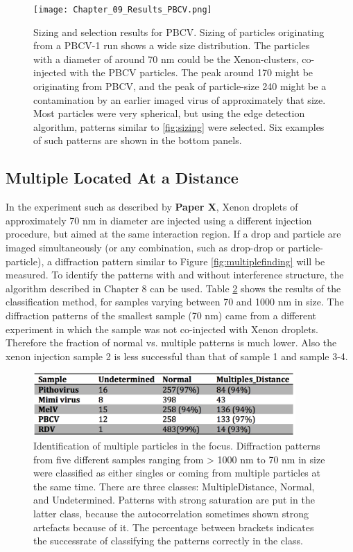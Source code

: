\begin{figure}[!ht]
\centering
\texttt{[image: Chapter\_09\_Results\_PBCV.png]}
\caption{Sizing and selection results for PBCV. Sizing of particles originating from a PBCV-1 run shows a wide size distribution. The particles with a diameter of around 70 nm could be the Xenon-clusters, co-injected with the PBCV particles. The peak around 170 might be originating from PBCV, and the peak of particle-size 240 might be a contamination by an earlier imaged virus of approximately that size. Most particles were very spherical, but using the edge detection algorithm, patterns similar to \ref{fig:sizing} were selected. Six examples of such patterns are shown in the bottom panels.}\label{fig:PatternSelection}

\end{figure}


\subsection{Multiple Located At a Distance}

In the experiment such as described by \textbf{Paper X}, Xenon droplets of approximately 70 nm in diameter are injected using a different injection procedure, but aimed at the same interaction region. If a drop and particle are imaged simultaneously (or any combination, such as drop-drop or particle-particle), a diffraction pattern similar to Figure \ref{fig:multiplefinding} will be measured. To identify the patterns with and without interference structure, the algorithm described in Chapter 8 can be used. Table \ref{fig:multiple_find} shows the results of the classification method, for samples varying between 70 and 1000 nm in size. The diffraction patterns of the smallest sample (70 nm) came from a different experiment in which the sample was not co-injected with Xenon droplets. Therefore the fraction of normal vs. multiple patterns is much lower. Also the xenon injection sample 2 is less successful than that of sample 1 and sample 3-4.

\begin{figure}[!ht]
\centering
\includegraphics[width=100mm]{Chapter_09_Results_successrate.png}
\caption{Identification of multiple particles in the focus. Diffraction patterns from five different samples ranging from > 1000 nm to 70 nm in size were classified as either singles or coming from multiple particles at the same time. There are three classes: MultipleDistance, Normal, and Undetermined. Patterns with strong saturation are put in the latter class, because the autocorrelation sometimes shown strong artefacts because of it. The percentage between brackets indicates the successrate of classifying the patterns correctly in the class.}\label{fig:multiple_find}

\end{figure}

